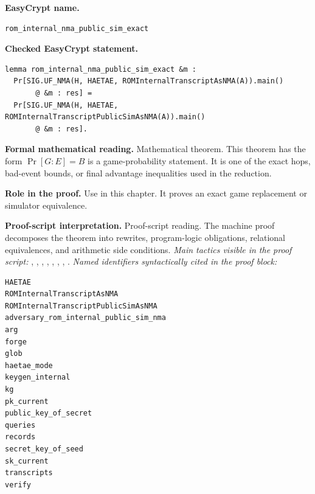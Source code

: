 \begin{formaltheorem}
\noindent\textbf{EasyCrypt name.}
\begin{lstlisting}[language=EasyCrypt,basicstyle=\ttfamily\scriptsize]
rom_internal_nma_public_sim_exact
\end{lstlisting}
\noindent\textbf{Checked EasyCrypt statement.}
\begin{lstlisting}[language=EasyCrypt,basicstyle=\ttfamily\scriptsize]
lemma rom_internal_nma_public_sim_exact &m :
  Pr[SIG.UF_NMA(H, HAETAE, ROMInternalTranscriptAsNMA(A)).main()
       @ &m : res] =
  Pr[SIG.UF_NMA(H, HAETAE, ROMInternalTranscriptPublicSimAsNMA(A)).main()
       @ &m : res].
\end{lstlisting}
\noindent\textbf{Formal mathematical reading.}
Mathematical theorem. This theorem has the form \(\Pr[G:E] = B\) is a game-probability statement.  It is one of the exact hops, bad-event bounds, or final advantage inequalities used in the reduction.

\noindent\textbf{Role in the proof.}
Use in this chapter. It proves an exact game replacement or simulator equivalence.

\noindent\textbf{Proof-script interpretation.}
Proof-script reading. The machine proof decomposes the theorem into rewrites, program-logic obligations, relational equivalences, and arithmetic side conditions.
\emph{Main tactics visible in the proof script:} , , , , , , , .
\emph{Named identifiers syntactically cited in the proof block:}
\begin{lstlisting}[language=EasyCrypt,basicstyle=\ttfamily\scriptsize]
HAETAE
ROMInternalTranscriptAsNMA
ROMInternalTranscriptPublicSimAsNMA
adversary_rom_internal_public_sim_nma
arg
forge
glob
haetae_mode
keygen_internal
kg
pk_current
public_key_of_secret
queries
records
secret_key_of_seed
sk_current
transcripts
verify
\end{lstlisting}

\end{formaltheorem}


